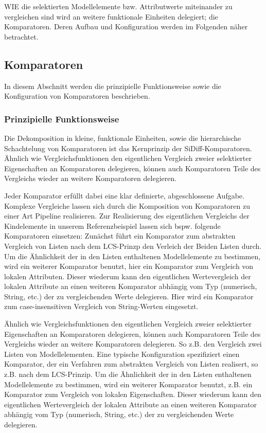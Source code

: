\documentclass[10pt,a4paper]{scrartcl}
\begin{document}
WIE die selektierten Modellelemente bzw. Attributwerte miteinander zu vergleichen sind
wird an weitere funktionale Einheiten delegiert; die Komparatoren. Deren Aufbau und Konfiguration
werden im Folgenden näher betrachtet.


\subsection{Komparatoren}
\label{comparators}
In diesem Abschnitt werden die prinzipielle Funktionsweise sowie die Konfiguration von Komparatoren 
beschrieben.

\subsubsection{Prinzipielle Funktionsweise}
Die Dekomposition in kleine, funktionale Einheiten, sowie die hierarchische Schachtelung
von Komparatoren ist das Kernprinzip der SiDiff-Komparatoren.
Ähnlich wie Vergleichsfunktionen den eigentlichen Vergleich zweier selektierter Eigenschaften an
Komparatoren delegieren, können auch Komparatoren Teile des Vergleichs wieder an weitere Komparatoren
delegieren.

Jeder Komparator erfüllt dabei eine klar definierte, abgeschlossene Aufgabe. Komplexe Vergleiche
lassen sich durch die Komposition von Komparatoren zu einer Art Pipeline realisieren. Zur Realisierung
des eigentlichen Vergleichs der Kindelemente in unserem Referenzbeispiel lassen sich bspw. folgende
Komparatoren einsetzen: Zunächst führt ein Komparator zum abstrakten Vergleich von Listen nach dem
LCS-Prinzp den Verleich der Beiden Listen durch. Um die Ähnlichkeit der in den Listen enthaltenen 
Modellelemente zu bestimmen, wird ein weiterer Komparator benutzt, hier ein Komparator zum Vergleich
von lokalen Attributen. Dieser wiederum kann den eigentlichen Wertevergleich der lokalen Attribute an einen
weiteren Komparator abhängig vom Typ (numerisch, String, etc.) der zu vergleichenden Werte delegieren.
Hier wird ein Komparator zum case-insensitiven Vergleich von String-Werten eingesetzt.

Ähnlich wie Vergleichsfunktionen den eigentlichen Vergleich zweier selektierter Eigenschaften an
Komparatoren delegieren, können auch Komparatoren Teile des Vergleichs wieder an weitere Komparatoren
delegieren. So z.B. den Vergleich zwei Listen von Modellelementen. Eine typische Konfiguration
spezifiziert einen Komparator, der ein Verfahren zum abstrakten Vergleich von Listen realisert,
so z.B. nach dem LCS-Prinzip. Um die Ähnlichkeit der in den Listen enthaltenen Modellelemente
zu bestimmen, wird ein weiterer Komparator benutzt, z.B. ein Komparator zum Vergleich von lokalen
Eigenschaften. Dieser wiederum kann den eigentlichen Wertevergleich der lokalen Attribute an einen
weiteren Komparator abhängig vom Typ (numerisch, String, etc.) der zu vergleichenden Werte delegieren.
\end{document}
